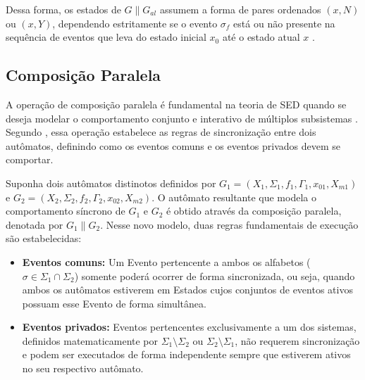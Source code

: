 Dessa forma, os estados de $G \parallel G_{al}$ assumem a forma de pares ordenados $(x, N)$ ou $(x, Y)$, dependendo estritamente se o evento $\sigma_f$ está ou não presente na sequência de eventos que leva do estado inicial $x_0$ até o estado atual $x$ \cite{basilio2010}. 

\subsection{Composição Paralela}

A operação de composição paralela é fundamental na teoria de SED quando se deseja modelar o comportamento conjunto e interativo de múltiplos subsistemas \cite{mestradoDudu}. Segundo \cite{basilio2010}, essa operação estabelece as regras de sincronização entre dois autômatos, definindo como os eventos comuns e os eventos privados devem se comportar.

Suponha dois autômatos distinotos definidos por $G_1 = (X_1, \Sigma_1, f_1, \Gamma_1, x_{01}, X_{m1})$ e $G_2 = (X_2, \Sigma_2, f_2, \Gamma_2, x_{02}, X_{m2})$. O autômato resultante que modela o comportamento síncrono de $G_1$ e $G_2$ é obtido através da composição paralela, denotada por $G_1 \parallel G_2$. Nesse novo modelo, duas regras fundamentais de execução são estabelecidas:
\begin{itemize}
	\item \textbf{Eventos comuns:} Um Evento pertencente a ambos os alfabetos ($\sigma \in \Sigma_1 \cap \Sigma_2$) somente poderá ocorrer de forma sincronizada, ou seja, quando ambos os autômatos estiverem em Estados cujos conjuntos de eventos ativos possuam esse Evento de forma simultânea.
	
	\item \textbf{Eventos privados:} Eventos pertencentes exclusivamente a um dos sistemas, definidos matematicamente por $\Sigma_1 \setminus \Sigma_2$ ou $\Sigma_2 \setminus \Sigma_1$, não requerem sincronização e podem ser executados de forma independente sempre que estiverem ativos no seu respectivo autômato.
\end{itemize}

